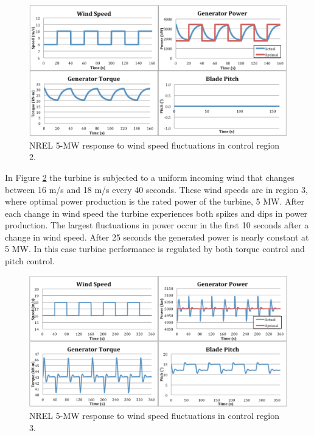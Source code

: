 \begin{figure}[htbp]
	\centering
		\includegraphics[width=\linewidth]{Figures/ch3Figures/fig3-3.png}
		
	\caption{NREL 5-MW response to wind speed fluctuations in control region 2.}
	\label{fig3-3}
\end{figure}

In Figure \ref{fig3-4} the turbine is subjected to a uniform incoming wind that changes between 16 m/s and 18 m/s every 40 seconds. These wind speeds are in region 3, where optimal power production is the rated power of the turbine, 5 MW. After each change in wind speed the turbine experiences both spikes and dips in power production.  The largest fluctuations in power occur in the first 10 seconds after a change in wind speed. After 25 seconds the generated power is nearly constant at 5 MW.  In this case turbine performance is regulated by both torque control and pitch control. 

\begin{figure}[htbp]
	\centering
		\includegraphics[width=\linewidth]{Figures/ch3Figures/fig3-4.png}
		
	\caption{NREL 5-MW response to wind speed fluctuations in control region 3.}
	\label{fig3-4}
\end{figure}


